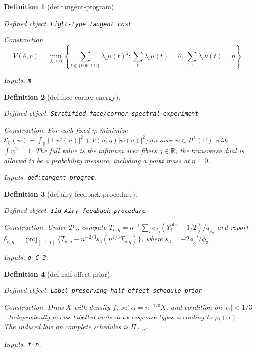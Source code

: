 \documentclass{article}
\newtheorem{definition}{Definition}
\begin{document}
\begin{definition}[def:tangent-program]\label{def:tangent-program}
\par\smallskip\noindent\emph{Defined object.} \texttt{Eight-\allowbreak{}type tangent cost}
\par\smallskip\noindent\emph{Construction.} \[V(\theta,\eta)=\min_{\lambda\ge0}\left\{\sum_{t\notin\{000,111\}}\lambda_t\mu(t)^2:\sum_t\lambda_t\mu(t)=\theta,\ \sum_t\lambda_t\nu(t)=\eta\right\}.\]
\par\smallskip\noindent\emph{Inputs.} \texttt{m}.
\end{definition}

\begin{definition}[def:face-corner-energy]\label{def:face-corner-energy}
\par\smallskip\noindent\emph{Defined object.} \texttt{Stratified face/\allowbreak{}corner spectral experiment}
\par\smallskip\noindent\emph{Construction.} For each fixed \(\eta\), minimize \(\mathcal E_\eta(\psi)=\int_{\mathbb R}\{4|\psi'(u)|^2+V(u,\eta)|\psi(u)|^2\}\,du\) over \(\psi\in H^1(\mathbb R)\) with \(\int\psi^2=1\). The full value is the infimum over fibers \(\eta\in\mathbb R\); the transverse dual is allowed to be a probability measure, including a point mass at \(\eta=0\).
\par\smallskip\noindent\emph{Inputs.} \texttt{def:\allowbreak{}tangent-\allowbreak{}program}.
\end{definition}

\begin{definition}[def:airy-feedback-procedure]\label{def:airy-feedback-procedure}
\par\smallskip\noindent\emph{Defined object.} \texttt{Iid Airy-\allowbreak{}feedback procedure}
\par\smallskip\noindent\emph{Construction.} Under \(\mathcal D_q\), compute \(T_{n,q}=n^{-1}\sum_i c_{A_i}(Y_i^{\mathrm{obs}}-1/2)/q_{A_i}\) and report \(\delta_{n,q}=\operatorname{proj}_{[-1,1]}\{T_{n,q}-n^{-2/3}s_3(n^{1/3}T_{n,q})\}\), where \(s_3=-2\phi_3'/\phi_3\).
\par\smallskip\noindent\emph{Inputs.} \texttt{q}; \texttt{C\_\allowbreak{}3}.
\end{definition}

\begin{definition}[def:half-effect-prior]\label{def:half-effect-prior}
\par\smallskip\noindent\emph{Defined object.} \texttt{Label-\allowbreak{}preserving half-\allowbreak{}effect schedule prior}
\par\smallskip\noindent\emph{Construction.} Draw \(X\) with density \(f\), set \(\alpha=n^{-1/3}X\), and condition on \(|\alpha|<1/3\). Independently across labelled units draw response types according to \(p_t(\alpha)\). The induced law on complete schedules is \(\Pi_{A,n}\).
\par\smallskip\noindent\emph{Inputs.} \texttt{f}; \texttt{n}.
\end{definition}
\end{document}
